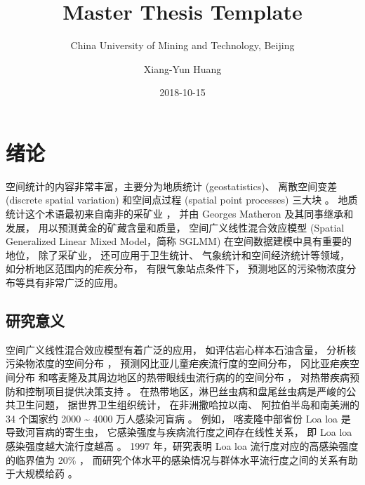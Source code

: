 \documentclass[12pt,a4paper,UTF8,twoside]{book}
\title{Master Thesis Template}
\subtitle{China University of Mining and Technology, Beijing}
\author{Xiang-Yun Huang}
\date{2018-10-15}
\theoremstyle{definition}
\theoremstyle{definition}
\theoremstyle{definition}
\theoremstyle{remark}
\begin{document}





{
\setcounter{tocdepth}{2}
\tableofcontents
}

\mainmatter

\hypertarget{intro}{%
\chapter{绪论}\label{intro}}

空间统计的内容非常丰富，主要分为地质统计 (geostatistics)、 离散空间变差
(discrete spatial variation) 和空间点过程 (spatial point processes)
三大块 \citep{Cressie1993}。 地质统计这个术语最初来自南非的采矿业
\citep{Krige1951}， 并由 Georges Matheron 及其同事继承和发展，
用以预测黄金的矿藏含量和质量， 空间广义线性混合效应模型 (Spatial
Generalized Linear Mixed Model，简称 SGLMM)
在空间数据建模中具有重要的地位， 除了采矿业， 还可应用于卫生统计、
气象统计和空间经济统计等领域， 如分析地区范围内的疟疾分布，
有限气象站点条件下， 预测地区的污染物浓度分布等具有非常广泛的应用。

\hypertarget{motivations}{%
\section{研究意义}\label{motivations}}

空间广义线性混合效应模型有着广泛的应用， 如评估岩心样本石油含量，
分析核污染物浓度的空间分布 \citep{Diggle1998}，
预测冈比亚儿童疟疾流行度的空间分布， 冈比亚疟疾空间分布
\citep{Thomson1999, Diggle2002Childhood}
和喀麦隆及其周边地区的热带眼线虫流行病的的空间分布
\citep{Diggle2007ATMP}， 对热带疾病预防和控制项目提供决策支持
\citep{Schl2016Using}。
在热带地区，淋巴丝虫病和盘尾丝虫病是严峻的公共卫生问题，
据世界卫生组织统计， 在非洲撒哈拉以南、 阿拉伯半岛和南美洲的 34 个国家约
2000 \textasciitilde{} 4000 万人感染河盲病 \citep{Takougang2002Rapid}。
例如， 喀麦隆中部省份 Loa loa 是导致河盲病的寄生虫，
它感染强度与疾病流行度之间存在线性关系， 即 Loa loa
感染强度越大流行度越高 \citep{Boussinesq2001}。 1997 年，研究表明 Loa
loa 流行度对应的高感染强度的临界值为 20\% \citep{Gardon1997Serious}，
而研究个体水平的感染情况与群体水平流行度之间的关系有助于大规模给药
\citep{Schl2016Using}。
\end{document}
